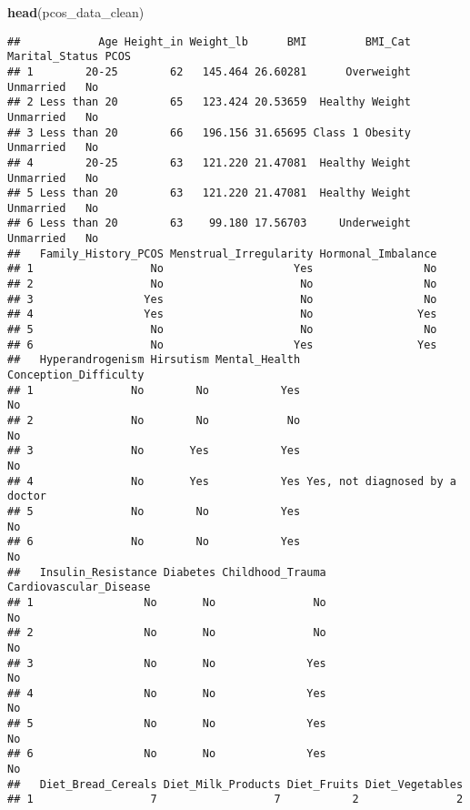 \documentclass[
]{article}
\newenvironment{Shaded}{\begin{snugshade}}{\end{snugshade}}
\newcommand{\FunctionTok}[1]{\textcolor[rgb]{0.13,0.29,0.53}{\textbf{#1}}}
\newcommand{\NormalTok}[1]{#1}
\begin{document}
\begin{Shaded}
\begin{Highlighting}[]
\FunctionTok{head}\NormalTok{(pcos\_data\_clean)}
\end{Highlighting}
\end{Shaded}

\begin{verbatim}
##            Age Height_in Weight_lb      BMI         BMI_Cat Marital_Status PCOS
## 1        20-25        62   145.464 26.60281      Overweight      Unmarried   No
## 2 Less than 20        65   123.424 20.53659  Healthy Weight      Unmarried   No
## 3 Less than 20        66   196.156 31.65695 Class 1 Obesity      Unmarried   No
## 4        20-25        63   121.220 21.47081  Healthy Weight      Unmarried   No
## 5 Less than 20        63   121.220 21.47081  Healthy Weight      Unmarried   No
## 6 Less than 20        63    99.180 17.56703     Underweight      Unmarried   No
##   Family_History_PCOS Menstrual_Irregularity Hormonal_Imbalance
## 1                  No                    Yes                 No
## 2                  No                     No                 No
## 3                 Yes                     No                 No
## 4                 Yes                     No                Yes
## 5                  No                     No                 No
## 6                  No                    Yes                Yes
##   Hyperandrogenism Hirsutism Mental_Health          Conception_Difficulty
## 1               No        No           Yes                             No
## 2               No        No            No                             No
## 3               No       Yes           Yes                             No
## 4               No       Yes           Yes Yes, not diagnosed by a doctor
## 5               No        No           Yes                             No
## 6               No        No           Yes                             No
##   Insulin_Resistance Diabetes Childhood_Trauma Cardiovascular_Disease
## 1                 No       No               No                     No
## 2                 No       No               No                     No
## 3                 No       No              Yes                     No
## 4                 No       No              Yes                     No
## 5                 No       No              Yes                     No
## 6                 No       No              Yes                     No
##   Diet_Bread_Cereals Diet_Milk_Products Diet_Fruits Diet_Vegetables
## 1                  7                  7           2               2

\end{verbatim}
\end{document}
